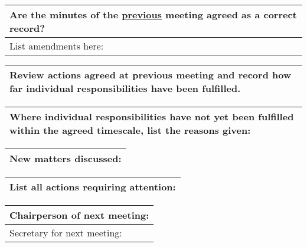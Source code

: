 \documentclass{article}
\begin{document}
\begin{table}[H]
	\centering
	\begin{tabular}{| p{12cm}  |}
	\hline
	Are the minutes of the \underline{previous} meeting agreed as a correct record? \\ \hline
	List amendments here: \\ \hline
\end{tabular}
\end{table}

\begin{table}[H]
	\centering
	\begin{tabular}{| p{12cm}  |}
	\hline
	Review actions agreed at previous meeting and record how far individual responsibilities have been fulfilled. \\ \hline
\end{tabular}
\end{table}

\begin{table}[H]
	\centering
	\begin{tabular}{| p{12cm}  |}
	\hline
	Where individual responsibilities have not yet been fulfilled within the agreed timescale, list the reasons given: \\ \hline
\end{tabular}
\end{table}

\begin{table}[H]
	\centering
	\begin{tabular}{| p{12cm}  |}
	\hline
	New matters discussed: \\ \hline
\end{tabular}
\end{table}

\begin{table}[H]
	\centering
	\begin{tabular}{| p{12cm}  |}
	\hline
	List all actions requiring attention: \\ \hline
\end{tabular}
\end{table}

\begin{table}[H]
	\centering
	\begin{tabular}{| p{12cm}  |}
	\hline
	Chairperson of next meeting: \\ \hline
	Secretary for next meeting:\\ \hline
\end{tabular}
\end{table}
\end{document}
